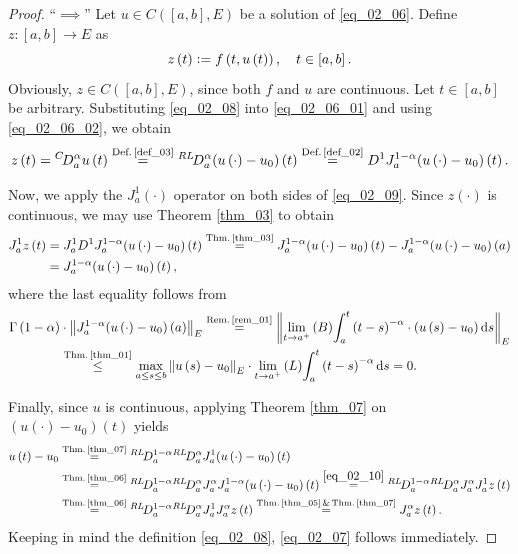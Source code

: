 \documentclass[reqno]{amsart}
\numberwithin{equation}{section}
\theoremstyle{definition}
\theoremstyle{remark}
\newcommand{\Bint}[3]{\br{B}\!\displaystyle\int_{#1}^{#2}{#3}}
\newcommand{\br}[1]{\left(#1\right)}
\newcommand{\C}[2]{C\br{#1,#2}}
\newcommand{\D}[1]{D^1#1}
\newcommand{\DC}[3]{{}^{C}\!D^{#1}_{#2}{#3}}
\newcommand{\defRef}[1]{\textrm{Def.\,\ref{#1}}}
\newcommand{\defeq}{\vcentcolon=}
\newcommand{\DRL}[3]{{}^{RL}\!D^{#1}_{#2}{#3}}
\newcommand{\ds}{\mathrm{d}s}
\newcommand{\eqText}[1]{\stackrel{#1}{=}}
\newcommand{\JRL}[3]{J^{#1}_{#2}{#3}}
\newcommand{\leqText}[1]{\stackrel{#1}{\leq}}
\newcommand{\Lint}[3]{\br{L}\!\displaystyle\int_{#1}^{#2}{#3}}
\newcommand{\remRef}[1]{\textrm{Rem.\,\ref{#1}}}
\newcommand{\sbr}[1]{\left[#1\right]}
\newcommand{\st}{\!:}
\newcommand{\theoremRef}[1]{\textrm{Theorem \ref{#1}}}
\newcommand{\thmRef}[1]{\textrm{Thm.\,\ref{#1}}}
\begin{document}
	\begin{proof}
	\enquote{$\implies$} Let $u\in\C{\sbr{a,b}}{E}$ be a solution of \eqref{eq_02_06}. Define $z\st\sbr{a,b}\rightarrow{E}$ as
	\begin{equation}\label{eq_02_08}
		z\br{t}\defeq{f}\br{t,u\br{t}},\quad{t}\in\sbr{a,b}.
	\end{equation}
	Obviously, $z\in\C{\sbr{a,b}}{E}$, since both $f$ and $u$ are continuous. Let $t\in\sbr{a,b}$ be arbitrary. Substituting \eqref{eq_02_08} into \eqref{eq_02_06_01} and using \eqref{eq_02_06_02}, we obtain
	\begin{equation}\label{eq_02_09}
		z\br{t}=\DC{\alpha}{a}{u}\br{t}\eqText{\defRef{def_03}}\DRL{\alpha}{a}{\br{u\br{\cdot}-u_0}}\br{t}\eqText{\defRef{def_02}}\D{\JRL{1-\alpha}{a}{\br{u\br{\cdot}-u_0}}}\br{t}.
	\end{equation}
	
	Now, we apply the $\JRL{1}{a}{\br{\cdot}}$ operator on both sides of \eqref{eq_02_09}. Since $z\br{\cdot}$ is continuous, we may use \theoremRef{thm_03} to obtain
	\begin{equation}\label{eq_02_10}
		\begin{aligned}
			\JRL{1}{a}{z}\br{t}&=\JRL{1}{a}{\D{\JRL{1-\alpha}{a}{\br{u\br{\cdot}-u_0}}}}\br{t}\eqText{\thmRef{thm_03}}\JRL{1-\alpha}{a}{\br{u\br{\cdot}-u_0}}\br{t}-\JRL{1-\alpha}{a}{\br{u\br{\cdot}-u_0}}\br{a}\\
			&=\JRL{1-\alpha}{a}{\br{u\br{\cdot}-u_0}}\br{t},
		\end{aligned}
	\end{equation}
	where the last equality follows from
	\begin{equation}\label{eq_02_11}
		\begin{aligned}
			\Gamma\br{1-\alpha}&\cdot\norm{\JRL{1-\alpha}{a}{\br{u\br{\cdot}-u_0}}\br{a}}_E\eqText{\remRef{rem_01}}\norm{\lim_{t\rightarrow{a}^+}\Bint{a}{t}{\br{t-s}^{-\alpha}\cdot\br{u\br{s}-u_0}\ds}}_E\\
			&\leqText{\thmRef{thm_01}}\max_{a\leq{s}\leq{b}}\norm{u\br{s}-u_0}_E\cdot\lim_{t\rightarrow{a}^+}\Lint{a}{t}{\br{t-s}^{-\alpha}\ds}=0.
		\end{aligned}
	\end{equation}
	
	Finally, since $u$ is continuous, applying \theoremRef{thm_07} on $\br{u\br{\cdot}-u_0}\br{t}$ yields
	\begin{equation*}
		\begin{aligned}
			u\br{t}-u_0&\eqText{\thmRef{thm_07}}\DRL{1-\alpha}{a}{\DRL{\alpha}{a}{\JRL{1}{a}{\br{u\br{\cdot}-u_0}}}}\br{t}\\
			&\eqText{\thmRef{thm_06}}\DRL{1-\alpha}{a}{\DRL{\alpha}{a}{\JRL{\alpha}{a}{\JRL{1-\alpha}{a}{\br{u\br{\cdot}-u_0}}}}}\br{t}\eqText{\eqref{eq_02_10}}\DRL{1-\alpha}{a}{\DRL{\alpha}{a}{\JRL{\alpha}{a}{\JRL{1}{a}{z}}}}\br{t}\\
			&\eqText{\thmRef{thm_06}}\DRL{1-\alpha}{a}{\DRL{\alpha}{a}{\JRL{1}{a}{\JRL{\alpha}{a}{z}}}}\br{t}\eqText{\thmRef{thm_05}\,\&\,\thmRef{thm_07}}\JRL{\alpha}{a}{z}\br{t}.
		\end{aligned}
	\end{equation*}
	Keeping in mind the definition \eqref{eq_02_08}, \eqref{eq_02_07} follows immediately.
	

\end{proof}
\end{document}
